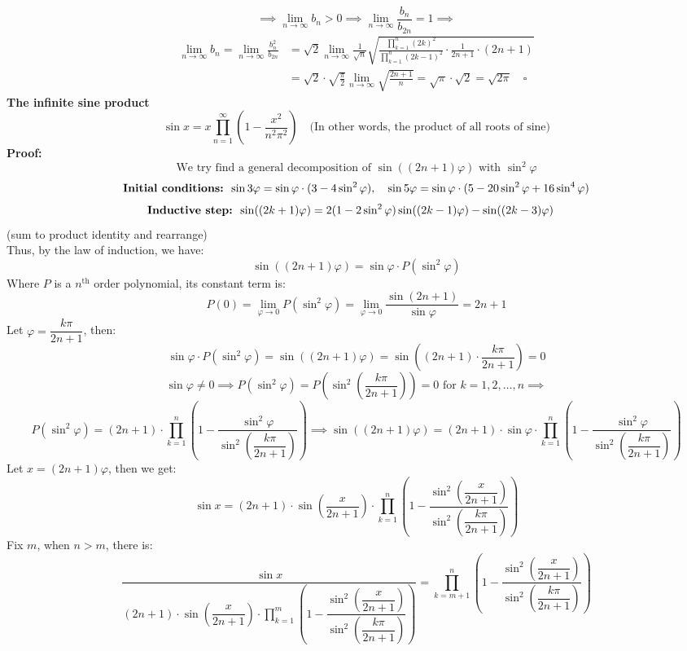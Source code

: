\documentclass{article}
\newcommand{\0}{{\bf{0}}}
\begin{document}
$$\implies\lim_{n\to\infty}b_n>0\implies\lim_{n\to\infty}\frac{b_n}{b_{2n}}=1\implies$$
\begin{equation}
\begin{split}
    \lim_{n\to\infty}b_n=\lim_{n\to\infty}\frac{b_n^2}{b_{2n}}&=\sqrt{2}\lim_{n\to\infty}\frac{1}{\sqrt{n}}\sqrt{\frac{\prod\limits_{k=1}^n(2k)^2}{\prod\limits_{k=1}^n(2k-1)^2}\cdot\frac{1}{2n+1}\cdot(2n+1)}\\
    &=\sqrt{2}\cdot\sqrt{\frac{\pi}{2}}\lim_{n\to\infty}\sqrt{\frac{2n+1}{n}}=\sqrt{\pi}\cdot\sqrt{2}=\sqrt{2\pi}\quad\square
\end{split}
\end{equation}
\textbf{The infinite sine product}
$$\sin x=x\prod_{n=1}^\infty\left(1-\frac{x^2}{n^2\pi^2}\right)\quad\mbox{(In other words, the product of all roots of sine)}$$
\textbf{Proof:}
$$\mbox{We try find a general decomposition of }\sin((2n+1)\varphi)\mbox{ with }\sin^2\varphi$$
$$\mbox{\textbf{Initial conditions: }}\sin3\varphi=\sin\varphi\cdot(3-4\sin^2\varphi),\quad\sin5\varphi=\sin\varphi\cdot(5-20\sin^2\varphi+16\sin^4\varphi)$$
$$\mbox{\textbf{Inductive step: }}\sin((2k+1)\varphi)=2(1-2\sin^2\varphi)\sin((2k-1)\varphi)-\sin((2k-3)\varphi)\quad$$
\null\hfill(sum to product identity and rearrange)\\
Thus, by the law of induction, we have:
$$\sin((2n+1)\varphi)=\sin\varphi\cdot P(\sin^2\varphi)$$
Where $P$ is a $n^{\mbox{th}}$ order polynomial, its constant term is:
$$P(0)=\lim_{\varphi\to0}P(\sin^2\varphi)=\lim_{\varphi\to0}\frac{\sin(2n+1)}{\sin\varphi}=2n+1$$
Let $\varphi=\dfrac{k\pi}{2n+1}$, then:
$$\sin\varphi\cdot P(\sin^2\varphi)=\sin((2n+1)\varphi)=\sin\left((2n+1)\cdot\frac{k\pi}{2n+1}\right)=0$$
$$\sin\varphi\neq0\implies P(\sin^2\varphi)=P\left(\sin^2\left(\frac{k\pi}{2n+1}\right)\right)=0\mbox{ for }k=1,2,\dots,n\implies$$
$$P(\sin^2\varphi)=(2n+1)\cdot\prod_{k=1}^n\left(1-\dfrac{\sin^2\varphi}{\sin^2\left(\dfrac{k\pi}{2n+1}\right)}\right)\implies \sin((2n+1)\varphi)=(2n+1)\cdot\sin\varphi\cdot\prod_{k=1}^n\left(1-\dfrac{\sin^2\varphi}{\sin^2\left(\dfrac{k\pi}{2n+1}\right)}\right)$$
Let $x=(2n+1)\varphi$, then we get:
$$\sin x=(2n+1)\cdot\sin\left(\dfrac{x}{2n+1}\right)\cdot\prod_{k=1}^n\left(1-\dfrac{\sin^2\left(\dfrac{x}{2n+1}\right)}{\sin^2\left(\dfrac{k\pi}{2n+1}\right)}\right)$$
Fix $m$, when $n>m$, there is:
$$\dfrac{\sin x}{(2n+1)\cdot\sin\left(\dfrac{x}{2n+1}\right)\cdot\prod\limits_{k=1}^m\left(1-\dfrac{\sin^2\left(\dfrac{x}{2n+1}\right)}{\sin^2\left(\dfrac{k\pi}{2n+1}\right)}\right)}=\prod_{k=m+1}^n\left(1-\dfrac{\sin^2\left(\dfrac{x}{2n+1}\right)}{\sin^2\left(\dfrac{k\pi}{2n+1}\right)}\right)$$
\end{document}
